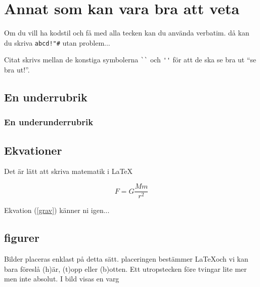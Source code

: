 \documentclass[11p]{article}
\begin{document}
    \section{Annat som kan vara bra att veta}
    Om du vill ha kodstil och få med alla tecken kan du använda verbatim. då kan du skriva \verb|abcd!"#| utan problem...

    Citat skrivs mellan de konstiga symbolerna \verb|``| och \verb|''| för att de ska se bra ut ``se bra ut!''.
    \subsection{En underrubrik}
    \subsubsection{En underunderrubrik}
    \subsection{Ekvationer}
    Det är lätt att skriva matematik i \LaTeX

    \begin{equation}
        F = G \frac{M m}{r^2}
        \label{grav}
    \end{equation}

    Ekvation (\ref{grav}) känner ni igen...

    \subsection{figurer}
    Bilder placeras enklast på detta sätt. placeringen bestämmer \LaTeX och vi kan bara föreslå (h)är, (t)opp eller (b)otten. Ett utropstecken före tvingar lite mer men inte absolut. I bild  visas en varg
    \printbibliography
\end{document}
